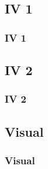 \documentclass[nototal,handout]{beamer}
\begin{document}
\subsection{IV 1} 

\begin{frame}
	\frametitle{IV 1}
 \end{frame} 

\subsection{IV 2} 

\begin{frame}
	\frametitle{IV 2}
 \end{frame} 

\subsection{Visual} 

\begin{frame}
	\frametitle{Visual}
 \end{frame}
\end{document}
